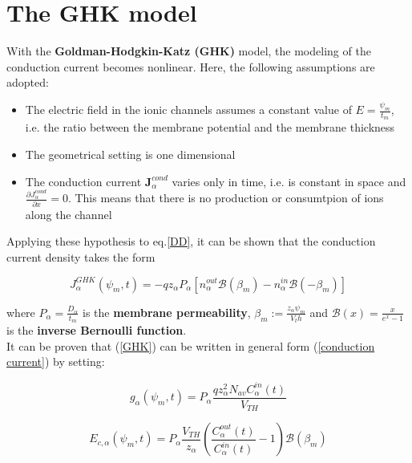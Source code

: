\documentclass[12pt, a4paper]{report}
\begin{document}
\section{The GHK model}
With the \textbf{Goldman-Hodgkin-Katz (GHK)} model, the modeling of the conduction current becomes nonlinear. Here, the following assumptions are adopted: 

\begin{itemize}
	
	\item The electric field in the ionic channels assumes a constant value of $ E = \frac{\psi_m}{t_m}$, i.e. the ratio between the membrane potential and the membrane thickness
	
	\item The geometrical setting is one dimensional
	
	\item The conduction current $\textbf{J}_{\alpha}^{cond}$ varies only in time, i.e. is constant in space and $ \frac{\partial J_{\alpha}^{cond} }{\partial x} = 0$. This means that there is no production or consumtpion of ions along the channel
	
\end{itemize}

Applying these hypothesis to eq.\ref{DD}, it can be shown that the conduction current density takes the form

\begin{equation}
J_{\alpha}^{GHK}(\psi_m,t) = -qz_{\alpha}P_{\alpha}\left[n_{\alpha}^{out} \mathcal{B}(\beta_m) - n_{\alpha}^{in} \mathcal{B}(-\beta_m) \right] \label{GHK}
\end{equation}

where $P_{\alpha} = \frac{D_{\alpha}}{t_m}$ is the \textbf{membrane permeability}, $ \beta_m := \frac{z_{\alpha} \psi_m}{V_th}$ and $ \mathcal{B}(x) = \frac{x}{e^x -1}$ is the \textbf{inverse Bernoulli function}.\\
It can be proven \cite{35} that (\ref{GHK}) can be written in general form (\ref{conduction current}) by setting:

\begin{equation}
g_{\alpha}(\psi_m,t) = P_{\alpha}\frac{q z_{\alpha}^2N_{av}C_{\alpha}^{in}(t)}{V_{TH}} 
\end{equation}

\begin{equation}
E_{c,\alpha}(\psi_m,t) = P_{\alpha}\frac{V_{TH}}{z_{\alpha}} \left(\frac{C_{\alpha}^{out}(t)}{C_{\alpha}^{in}(t)} - 1\right)\mathcal{B}(\beta_m)
\end{equation}
\end{document}
